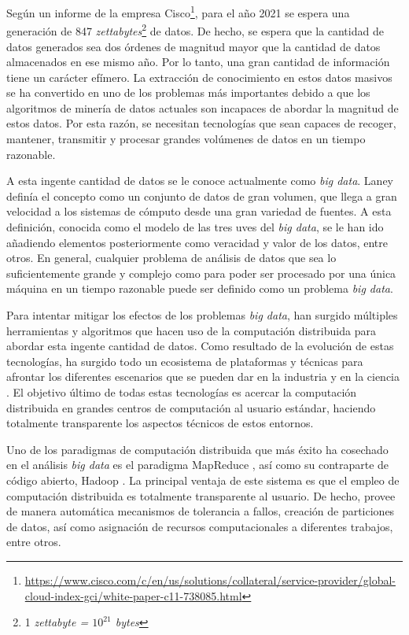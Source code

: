 \documentclass[c5paper,10pt,twoside]{book}	   	%
\begin{document}
Según un informe de la empresa Cisco\footnote{\url{https://www.cisco.com/c/en/us/solutions/collateral/service-provider/global-cloud-index-gci/white-paper-c11-738085.html}}, para el año 2021 se espera una generación de 847 \textit{zettabytes}\footnote{1 \textit{zettabyte = $10^{21}$ bytes}} de datos. De hecho, se espera que la cantidad de datos generados sea dos órdenes de magnitud mayor que la cantidad de datos almacenados en ese mismo año. Por lo tanto, una gran cantidad de información tiene un carácter efímero. La extracción de conocimiento en estos datos masivos se ha convertido en uno de los problemas más importantes debido a que los algoritmos de minería de datos actuales son incapaces de abordar la magnitud de estos datos. Por esta razón, se necesitan tecnologías que sean capaces de recoger, mantener, transmitir y procesar grandes volúmenes de datos en un tiempo razonable. 

A esta ingente cantidad de datos se le conoce actualmente como \textit{big data}. Laney \cite{Lan01} definía el concepto como un conjunto de datos de gran volumen, que llega a gran velocidad a los sistemas de cómputo desde una gran variedad de fuentes. A esta definición, conocida como el modelo de las tres uves del \textit{big data}, se le han ido añadiendo elementos posteriormente como veracidad y valor de los datos, entre otros. En general, cualquier problema de análisis de datos que sea lo suficientemente grande y complejo como para poder ser procesado por una única máquina en un tiempo razonable puede ser definido como un problema \textit{big data}.

Para intentar mitigar los efectos de los problemas \textit{big data}, han surgido múltiples herramientas y algoritmos que hacen uso de la computación distribuida para abordar esta ingente cantidad de datos. Como resultado de la evolución de estas tecnologías, ha surgido todo un ecosistema de plataformas y técnicas para afrontar los diferentes escenarios que se pueden dar en la industria y en la ciencia \cite{Frlbdbh14}. El objetivo último de todas estas tecnologías es acercar la computación distribuida en grandes centros de computación al usuario estándar, haciendo totalmente transparente los aspectos técnicos de estos entornos.

Uno de los paradigmas de computación distribuida que más éxito ha cosechado en el análisis \textit{big data} es el paradigma MapReduce \cite{Dg04,Dg08}, así como su contraparte de código abierto, Hadoop \cite{Whi12}. La principal ventaja de este sistema es que el empleo de computación distribuida es totalmente transparente al usuario. De hecho, provee de manera automática mecanismos de tolerancia a fallos, creación de particiones de datos, así como asignación de recursos computacionales a diferentes trabajos, entre otros. 
\end{document}
